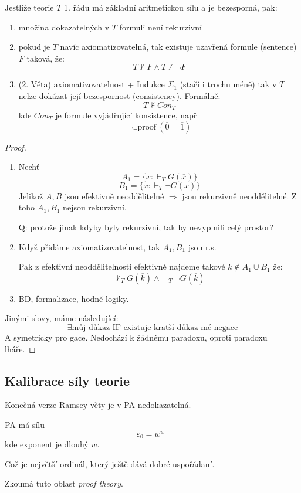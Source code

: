 \begin{theorem}
	Jestliže teorie $T$ 1. řádu má základní aritmetickou sílu a je bezesporná, pak:
	\begin{enumerate}
		\item množina dokazatelných v $T$ formuli není rekurzivní
		\item pokud je $T$ navíc axiomatizovatelná, tak existuje uzavřená formule (sentence) $F$ taková, že:
			\[ T \nvdash F \land T \nvdash \neg F \]
		\item (2. Věta) axiomatizovatelnost + Indukce $\Sigma_1$ (stačí i trochu méně) tak v $T$ nelze dokázat její bezespornost (consistency).
		Formálně:
		\[ T \nvdash Con_T \]
		kde $Con_T$ je formule vyjádřující konsistence, např
		\[ \neg \exists \text{proof}\ (\overline{0} = \overline{1}) \]
	\end{enumerate}
\end{theorem}
\begin{proof}
	\begin{enumerate}
		\item Nechť
			\[ A_1 = \{ x: \vdash_T G(\overline{x}) \} \]
			\[ B_1 = \{ x: \vdash_T \neg G(\overline{x}) \} \]
			Jelikož $A, B$ jsou efektivně neoddělitelné $\Rightarrow$ jsou rekurzivně neoddělitelné.
			Z toho $A_1, B_1$ nejsou rekurzivní.

			Q: protože jinak kdyby byly rekurzivní, tak by nevyplnili celý prostor?
		\item Když přidáme axiomatizovatelnost, tak $A_1, B_1$  jsou r.s.

			Pak z efektivní neoddělitelnosti efektivně najdeme takové $k \notin A_1 \cup B_1$ že:
			\[ \nvdash_T G(\overline{k}) \land \vdash_T \neg G(\overline{k}) \]
		\item BD, formalizace, hodně logiky.
	\end{enumerate}

	Jinými slovy, máme následující:
	\[ \exists \text{můj důkaz IF existuje kratší důkaz mé negace} \]
	A symetricky pro gace. Nedochází k žádnému paradoxu, oproti paradoxu lháře.
\end{proof}

\subsection{Kalibrace síly teorie}

\begin{note}
	Konečná verze Ramsey věty je v PA nedokazatelná.
\end{note}

\begin{note}
	PA má sílu
	\[ \varepsilon_0 = w^{w^{\ldots}} \]
	kde exponent je dlouhý $w$.

	Což je největší ordinál, který ještě dává dobré uspořádaní.

	Zkoumá tuto oblast \emph{proof theory}.
\end{note}
